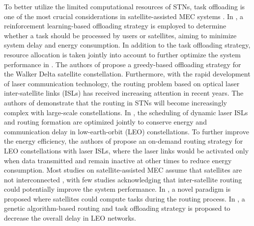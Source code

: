 \documentclass[journal,10pt]{IEEEtran}
\begin{document}
To better utilize the limited computational resources of STNs, task offloading is one of the most crucial considerations in satellite-assisted MEC systems \cite{xie2020satellite}. In \cite{wu2024multi}, a reinforcement learning-based offloading strategy is employed to determine whether a task should be processed by users or satellites, aiming to minimize system delay and energy consumption. In addition to the task offloading strategy, resource allocation is taken jointly into account to further optimize the system performance in \cite{zhang2023satellite, cao2022edge}. The authors of \cite{zhang2022aerial} propose a greedy-based offloading strategy for the Walker Delta satellite constellation. Furthermore, with the rapid development of laser communication technology, the routing problem based on optical laser inter-satellite links (ISLs) has received increasing attention in recent years. The authors of \cite{chen2021analysis} demonstrate that the routing in STNs will become increasingly complex with large-scale constellations. In \cite{wang2023optimization}, the scheduling of dynamic laser ISLs and routing formation are optimized jointly to conserve energy and communication delay in low-earth-orbit (LEO) constellations. To further improve the energy efficiency, the authors of \cite{bhattacharjee2024demand} propose an on-demand routing strategy for LEO constellations with laser ISLs, where the laser links would be activated only when data transmitted and remain inactive at other times to reduce energy consumption. Most studies on satellite-assisted MEC assume that satellites are not interconnected \cite{wu2024multi,zhang2023satellite, cao2022edge,zhang2022aerial}, with few studies acknowledging that inter-satellite routing could potentially improve the system performance. In \cite{wang2022cdmr}, a novel paradigm is proposed where satellites could compute tasks during the routing process. In \cite{cao2023computing}, a genetic algorithm-based routing and task offloading strategy is proposed to decrease the overall delay in LEO networks. 
\end{document}
